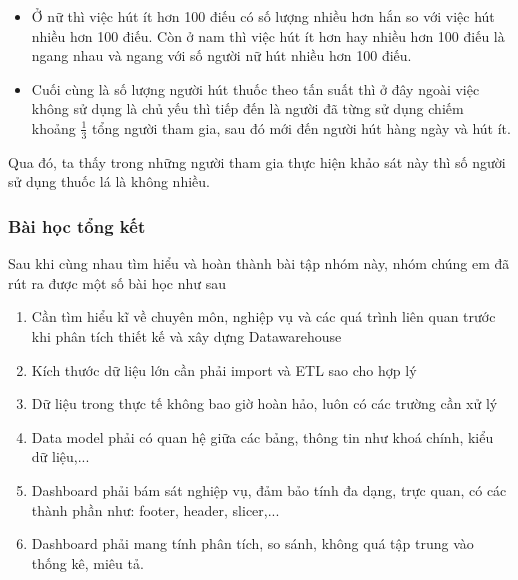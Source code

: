 \begin{enumerate}
\begin{itemize}[label= $-$]
        \item Ở nữ thì việc hút ít hơn 100 điếu có số lượng nhiều hơn hắn so với việc hút nhiều hơn 100 điếu. Còn ở nam thì việc hút ít hơn hay nhiều hơn 100 điếu là ngang nhau và ngang với số người nữ hút nhiều hơn 100 điếu.
        
        \item Cuối cùng là số lượng người hút thuốc theo tấn suất thì ở đây ngoài việc không sử dụng là chủ yếu thì tiếp đến là người đã từng sử dụng chiếm khoảng $\frac{1}{3}$ tổng người tham gia, sau đó mới đến người hút hàng ngày và hút ít.
    \end{itemize}
    Qua đó, ta thấy trong những người tham gia thực hiện khảo sát này thì số người sử dụng thuốc lá là không nhiều.
\end{enumerate}

\subsubsection{Bài học tổng kết}
Sau khi cùng nhau tìm hiểu và hoàn thành bài tập nhóm này, nhóm chúng em đã rút ra được một số bài học như sau
\begin{enumerate}
    \item Cần tìm hiểu kĩ về chuyên môn, nghiệp vụ và các quá trình liên quan trước khi phân tích thiết kế và xây dựng Datawarehouse

    \item Kích thước dữ liệu lớn cần phải import và ETL sao cho hợp lý
    
    \item Dữ liệu trong thực tế không bao giờ hoàn hảo, luôn có các trường cần xử lý
    
    \item Data model phải có quan hệ giữa các bảng, thông tin như khoá chính, kiểu dữ liệu,...
    
    \item Dashboard phải bám sát nghiệp vụ, đảm bảo tính đa dạng, trực quan, có các thành phần như: footer, header, slicer,...
    
    \item Dashboard phải mang tính phân tích, so sánh, không quá tập trung vào thống kê, miêu tả.
\end{enumerate}


